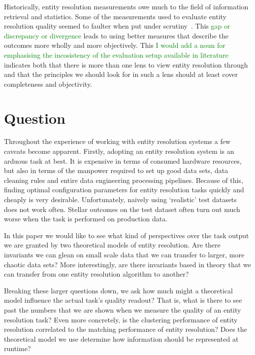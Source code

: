 \documentclass[journal]{IEEEtran}
\begin{document}
    Historically, entity resolution measurements owe much to the field of
    information retrieval and statistics.
    Some of the measurements used to evaluate entity resolution quality seemed
    to faulter when put under scrutiny~\cite{Goga2015}.
    This 
    \textcolor{green}{gap or discrepancy or divergence} 
    leads to using better measures that describe the outcomes more wholly
    and more objectively.
    This 
    \textcolor{green}{I would add a noun for emphasising the incosistency of the evaluation setup available in literature} 
    indicates both that there is more than one lens to view entity
    resolution through and that the principles we should look for in such a lens
    should at least cover completeness and objectivity.
    
    \section{Question}\label{sec:contributions}

    Throughout the experience of working with entity resolution systems a few
    caveats become apparent.
    Firstly, adopting an entity resolution system is an arduous task at best.
    It is expensive in terms of consumed hardware resources, but also in terms
    of the manpower required to set up good data sets, data cleaning rules and
    entire data engineering processing pipelines.
    Because of this, finding optimal configuration parameters for entity
    resolution tasks quickly and cheaply is very desirable.
    Unfortunately, naively using `realistic' test datasets does not work often.
    Stellar outcomes on the test dataset often turn out much worse when the task
    is performed on production data.

    In this paper we would like to see what kind of perspectives over the task
    output we are granted by two theoretical models of entity resolution.
    Are there invariants we can glean on small scale data that we can transfer
    to larger, more chaotic data sets?
    More interestingly, are there invariants based in theory that we can
    transfer from one entity resolution algorithm to another?

    Breaking these larger questions down, we ask how much might a theoretical
    model influence the actual task's quality readout?
    That is, what is there to see past the numbers that we are shown when we
    measure the quality of an entity resolution task?
    Even more concretely, is the clustering performance of entity resolution
    correlated to the matching performance of entity resolution?
    Does the theoretical model we use determine how information should be
    represented at runtime?
\end{document}
